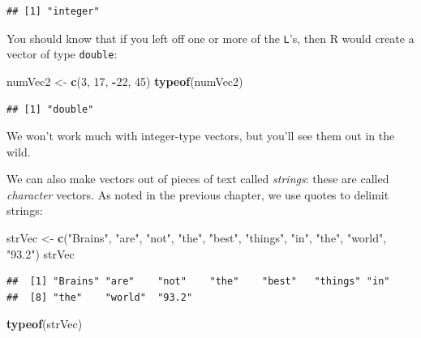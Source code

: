 \documentclass[]{book}
\makeatletter
\newenvironment{Shaded}{\begin{snugshade}}{\end{snugshade}}
\newcommand{\KeywordTok}[1]{\textcolor[rgb]{0.13,0.29,0.53}{\textbf{#1}}}
\newcommand{\DecValTok}[1]{\textcolor[rgb]{0.00,0.00,0.81}{#1}}
\newcommand{\StringTok}[1]{\textcolor[rgb]{0.31,0.60,0.02}{#1}}
\newcommand{\OperatorTok}[1]{\textcolor[rgb]{0.81,0.36,0.00}{\textbf{#1}}}
\newcommand{\NormalTok}[1]{#1}
\newenvironment{kframe}{%
\medskip{}
\setlength{\fboxsep}{.8em}
 \def\at@end@of@kframe{}%
 \ifinner\ifhmode%
  \def\at@end@of@kframe{\end{minipage}}%
  \begin{minipage}{\columnwidth}%
 \fi\fi%
 \def\FrameCommand##1{\hskip\@totalleftmargin \hskip-\fboxsep
 \colorbox{shadecolor}{##1}\hskip-\fboxsep
     \hskip-\linewidth \hskip-\@totalleftmargin \hskip\columnwidth}%
 \MakeFramed {\advance\hsize-\width
   \@totalleftmargin\z@ \linewidth\hsize
   \@setminipage}}%
 {\par\unskip\endMakeFramed%
 \at@end@of@kframe}
\renewenvironment{Shaded}{\begin{kframe}}{\end{kframe}}
\theoremstyle{definition}
\theoremstyle{definition}
\theoremstyle{definition}
\theoremstyle{remark}
\makeatother
\begin{document}
\begin{verbatim}
## [1] "integer"
\end{verbatim}

You should know that if you left off one or more of the \texttt{L}'s,
then R would create a vector of type \texttt{double}:

\begin{Shaded}
\begin{Highlighting}[]
\NormalTok{numVec2 <-}\StringTok{ }\KeywordTok{c}\NormalTok{(}\DecValTok{3}\NormalTok{, }\DecValTok{17}\NormalTok{, }\OperatorTok{-}\DecValTok{22}\NormalTok{, }\DecValTok{45}\NormalTok{)}
\KeywordTok{typeof}\NormalTok{(numVec2)}
\end{Highlighting}
\end{Shaded}

\begin{verbatim}
## [1] "double"
\end{verbatim}

We won't work much with integer-type vectors, but you'll see them out in
the wild.

We can also make vectors out of pieces of text called
\emph{strings}: these are called
\emph{character} vectors. As noted in the previous
chapter, we use quotes to delimit strings:

\begin{Shaded}
\begin{Highlighting}[]
\NormalTok{strVec <-}\StringTok{ }\KeywordTok{c}\NormalTok{(}\StringTok{"Brains"}\NormalTok{, }\StringTok{"are"}\NormalTok{, }\StringTok{"not"}\NormalTok{, }\StringTok{"the"}\NormalTok{, }\StringTok{"best"}\NormalTok{, }
            \StringTok{"things"}\NormalTok{, }\StringTok{"in"}\NormalTok{, }\StringTok{"the"}\NormalTok{, }\StringTok{"world"}\NormalTok{, }\StringTok{"93.2"}\NormalTok{)}
\NormalTok{strVec}
\end{Highlighting}
\end{Shaded}

\begin{verbatim}
##  [1] "Brains" "are"    "not"    "the"    "best"   "things" "in"    
##  [8] "the"    "world"  "93.2"
\end{verbatim}

\begin{Shaded}
\begin{Highlighting}[]
\KeywordTok{typeof}\NormalTok{(strVec)}
\end{Highlighting}
\end{Shaded}
\end{document}
